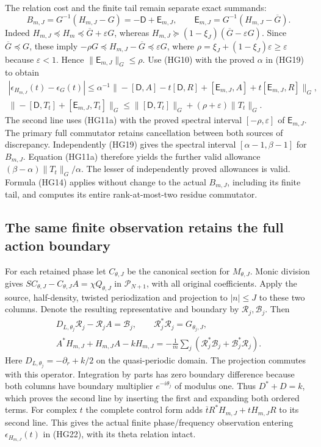 \documentclass{article}
\begin{document}
The relation cost and the finite tail remain separate exact summands:
\[
 B_{m,J}=G^{-1}(H_{m,J}-G)=-\mathsf D+\mathsf E_{m,J},
 \qquad \mathsf E_{m,J}=G^{-1}(H_{m,J}-\overline G).
 \tag{HG21}
\]
Indeed $H_{m,J}\preceq H_m\preceq\overline G+\varepsilon G$,
whereas
$H_{m,J}\succeq(1-\xi_J)(\overline G-\varepsilon G)$.
Since $\overline G\preceq G$, these imply
$-\rho G\preceq H_{m,J}-\overline G\preceq\varepsilon G$,
where $\rho=\xi_J+(1-\xi_J)\varepsilon\ge\varepsilon$ because
$\varepsilon<1$. Hence $\|\mathsf E_{m,J}\|_G\le\rho$.
Use (HG10) with the proved $\alpha$ in (HG19) to obtain
\[
\begin{gathered}
 |\epsilon_{H_{m,J}}(t)-\epsilon_G(t)|
 \le\alpha^{-1}\|
 -[\mathsf D,A]-t[\mathsf D,R]
 +[\mathsf E_{m,J},A]+t[\mathsf E_{m,J},R]\|_G,\\
 \|-[\mathsf D,T_t]+[\mathsf E_{m,J},T_t]\|_G
 \le\|[\mathsf D,T_t]\|_G+(\rho+\varepsilon)\|T_t\|_G .
\end{gathered}\tag{HG22}
\]
The second line uses (HG11a) with the proved spectral interval
$[-\rho,\varepsilon]$ of $\mathsf E_{m,J}$.
The primary full commutator retains cancellation between both sources
of discrepancy. Independently (HG19) gives the spectral interval
$[\alpha-1,\beta-1]$ for $B_{m,J}$. Equation (HG11a) therefore
yields the further valid allowance
$(\beta-\alpha)\|T_t\|_G/\alpha$.
The lesser of independently proved allowances is valid. Formula (HG14)
applies without change to the actual $B_{m,J}$, including its finite
tail, and computes its entire rank-at-most-two residue commutator.

\subsection{The same finite observation retains the full action boundary}

For each retained phase let $C_{\theta,J}$ be the canonical section
for $M_{\theta,J}$. Monic division gives
$SC_{\theta,J}-C_{\theta,J}A=\chi Q_{\theta,J}$ in
$\mathcal P_{N+1}$, with all original coefficients. Apply the source,
half-density, twisted periodization and projection to $|n|\le J$
to these two columns. Denote the resulting representative and boundary
by $\mathscr R_j,\mathscr B_j$. Then
\[
\begin{gathered}
 D_{L,\theta_j}\mathscr R_j-\mathscr R_jA=\mathscr B_j,
 \qquad \mathscr R_j^*\mathscr R_j=G_{\theta_j,J},\\
 A^*H_{m,J}+H_{m,J}A-kH_{m,J}
   =-\frac1m\sum_j(\mathscr R_j^*\mathscr B_j+
                              \mathscr B_j^*\mathscr R_j).
\end{gathered}\tag{HG23}
\]
Here $D_{L,\theta_j}=-\partial_r+k/2$ on the quasi-periodic domain.
The projection commutes with this operator. Integration by parts has
zero boundary difference because both columns have boundary multiplier
$e^{-i\theta_j}$ of modulus one. Thus $D^*+D=k$, which proves the
second line by inserting the first and expanding both ordered terms.
For complex $t$ the complete control form adds
$\overline t R^*H_{m,J}+tH_{m,J}R$ to its second line.
This gives the actual finite phase/frequency observation entering
$\epsilon_{H_{m,J}}(t)$ in (HG22), with its theta relation intact.
\end{document}
